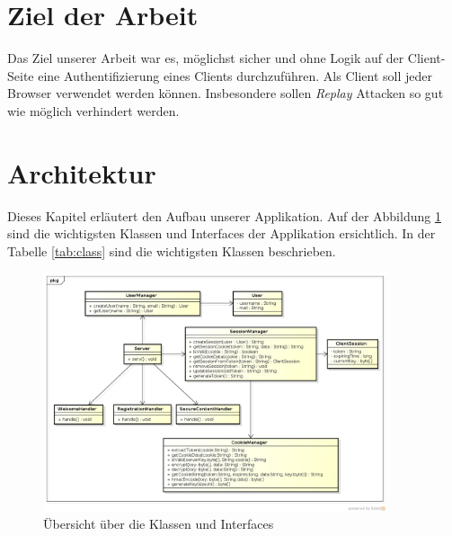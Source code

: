 \section{Ziel der Arbeit}

Das Ziel unserer Arbeit war es, möglichst sicher und ohne Logik auf der Client-Seite eine 
Authentifizierung eines Clients durchzuführen. Als Client soll jeder Browser verwendet werden können.
Insbesondere sollen \textit{Replay} Attacken so gut wie möglich verhindert werden.


\section{Architektur}

Dieses Kapitel erläutert den Aufbau unserer Applikation.
Auf der Abbildung \ref{fig:overview} sind die wichtigsten Klassen und Interfaces der Applikation ersichtlich. In der Tabelle \ref{tab:class} sind
die wichtigsten Klassen beschrieben.

\begin{figure}[H]
	\begin{center}
		\includegraphics[width=0.9\textwidth]{./content/Class_Overview_2.png}
	\end{center}
	\caption{Übersicht über die Klassen und Interfaces}
	\label{fig:overview}
\end{figure}

